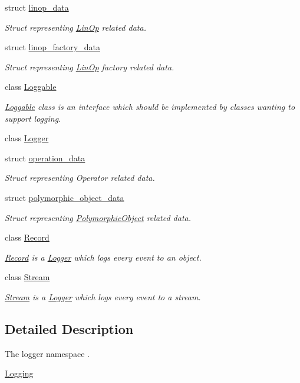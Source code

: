 \begin{DoxyCompactItemize}
struct \hyperlink{structgko_1_1log_1_1linop__data}{linop\+\_\+data}
\begin{DoxyCompactList}\small\item\em Struct representing \hyperlink{classgko_1_1LinOp}{Lin\+Op} related data. \end{DoxyCompactList}\item 
struct \hyperlink{structgko_1_1log_1_1linop__factory__data}{linop\+\_\+factory\+\_\+data}
\begin{DoxyCompactList}\small\item\em Struct representing \hyperlink{classgko_1_1LinOp}{Lin\+Op} factory related data. \end{DoxyCompactList}\item 
class \hyperlink{classgko_1_1log_1_1Loggable}{Loggable}
\begin{DoxyCompactList}\small\item\em \hyperlink{classgko_1_1log_1_1Loggable}{Loggable} class is an interface which should be implemented by classes wanting to support logging. \end{DoxyCompactList}\item 
class \hyperlink{classgko_1_1log_1_1Logger}{Logger}
\item 
struct \hyperlink{structgko_1_1log_1_1operation__data}{operation\+\_\+data}
\begin{DoxyCompactList}\small\item\em Struct representing Operator related data. \end{DoxyCompactList}\item 
struct \hyperlink{structgko_1_1log_1_1polymorphic__object__data}{polymorphic\+\_\+object\+\_\+data}
\begin{DoxyCompactList}\small\item\em Struct representing \hyperlink{classgko_1_1PolymorphicObject}{Polymorphic\+Object} related data. \end{DoxyCompactList}\item 
class \hyperlink{classgko_1_1log_1_1Record}{Record}
\begin{DoxyCompactList}\small\item\em \hyperlink{classgko_1_1log_1_1Record}{Record} is a \hyperlink{classgko_1_1log_1_1Logger}{Logger} which logs every event to an object. \end{DoxyCompactList}\item 
class \hyperlink{classgko_1_1log_1_1Stream}{Stream}
\begin{DoxyCompactList}\small\item\em \hyperlink{classgko_1_1log_1_1Stream}{Stream} is a \hyperlink{classgko_1_1log_1_1Logger}{Logger} which logs every event to a stream. \end{DoxyCompactList}\end{DoxyCompactItemize}


\subsection{Detailed Description}
The logger namespace . 

\hyperlink{group__log}{Logging} 